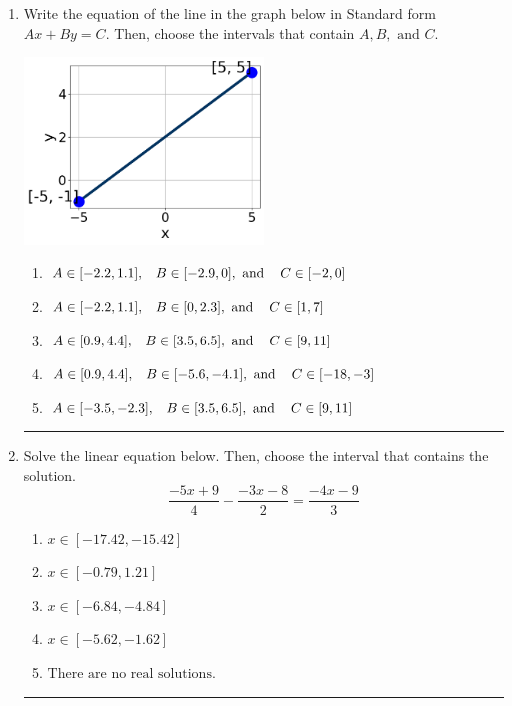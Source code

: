 \documentclass[14pt]{extbook}
\newcommand{\litem}[1]{\item#1\hspace*{-1cm}\rule{\textwidth}{0.4pt}}
\begin{document}
\begin{enumerate}
{\begin{enumerate}[label=\Alph*.]
\end{enumerate} }
\litem{
Write the equation of the line in the graph below in Standard form $Ax+By=C$. Then, choose the intervals that contain $A, B, \text{ and } C$.
\begin{center}
    \includegraphics[width=0.5\textwidth]{../Figures/linearGraphToStandardCopyA.png}
\end{center}
\begin{enumerate}[label=\Alph*.]
\item \( A \in [-2.2, 1.1], \hspace{3mm} B \in [-2.9, 0], \text{ and } \hspace{3mm} C \in [-2, 0] \)
\item \( A \in [-2.2, 1.1], \hspace{3mm} B \in [0, 2.3], \text{ and } \hspace{3mm} C \in [1, 7] \)
\item \( A \in [0.9, 4.4], \hspace{3mm} B \in [3.5, 6.5], \text{ and } \hspace{3mm} C \in [9, 11] \)
\item \( A \in [0.9, 4.4], \hspace{3mm} B \in [-5.6, -4.1], \text{ and } \hspace{3mm} C \in [-18, -3] \)
\item \( A \in [-3.5, -2.3], \hspace{3mm} B \in [3.5, 6.5], \text{ and } \hspace{3mm} C \in [9, 11] \)

\end{enumerate} }
\litem{
Solve the linear equation below. Then, choose the interval that contains the solution.\[ \frac{-5x + 9}{4} - \frac{-3x -8}{2} = \frac{-4x -9}{3} \]\begin{enumerate}[label=\Alph*.]
\item \( x \in [-17.42, -15.42] \)
\item \( x \in [-0.79, 1.21] \)
\item \( x \in [-6.84, -4.84] \)
\item \( x \in [-5.62, -1.62] \)
\item \( \text{There are no real solutions.} \)


\end{enumerate}}
\end{enumerate}
\end{document}
